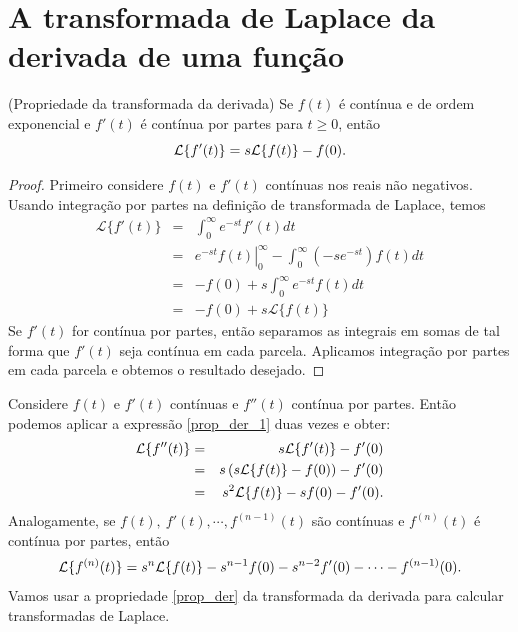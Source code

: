 \section{A transformada de Laplace da derivada de uma função}
\begin{teo}{\label{prop_der}}(Propriedade da transformada da derivada) Se $f(t)$ é contínua e de ordem exponencial e $f'(t)$ é contínua por partes para $t\geq 0$, então
\begin{equation}{\label{prop_der_1}}
\mathcal{L }\{f'(t)\}=s \mathcal{L }\{ f(t)\}-f(0).
\end{equation}
\end{teo}
\begin{proof}
Primeiro considere $f(t)$ e $f'(t)$ contínuas nos reais não negativos. Usando integração por partes na definição de transformada de Laplace, temos
\begin{eqnarray*}
 \mathcal{L}\{f'(t)\}&=&\int_0^\infty e^{-st} f'(t)dt\\
 &=&\left.e^{-st}f(t)\right|_0^\infty-  \int_0^\infty (-se^{-st}) f(t)dt\\
 &=&-f(0)+  s\int_0^\infty e^{-st}f(t)dt\\
 &=&-f(0)+  s\mathcal{L}\{f(t)\}
 \end{eqnarray*}
Se $f'(t)$ for contínua por partes, então separamos as integrais em somas de tal forma que $f'(t)$ seja contínua em cada parcela. Aplicamos integração por partes em cada parcela e obtemos o resultado desejado.
\end{proof}
Considere $f(t)$ e $f'(t)$ contínuas e $f''(t)$ contínua por partes. Então podemos aplicar a expressão \ref{prop_der_1} duas vezes e obter:
\begin{eqnarray}
\nonumber \mathcal{L }\{f''(t)\}&=&s \mathcal{L }\{ f'(t)\}-f'(0)\\
\nonumber &=&s\left( s \mathcal{L }\{ f(t)\}-f(0)\right)-f'(0)\\
&=& s^2 \mathcal{L }\{ f(t)\}-sf(0)-f'(0). {\label{prop_der_2}}
\end{eqnarray}
Analogamente, se $f(t),\ f'(t), \cdots, f^{(n-1)}(t)$ são contínuas e $f^{(n)}(t) $ é contínua por partes, então
\begin{eqnarray}{\label{prop_der_n}}
 \mathcal{L }\{f^{(n)}(t)\}= s^n \mathcal{L }\{ f(t)\}-s^{n-1}f(0)-s^{n-2}f'(0)-\cdots-f^{(n-1)}(0).
\end{eqnarray}
Vamos usar a propriedade \ref{prop_der} da transformada da derivada para calcular transformadas de Laplace.
